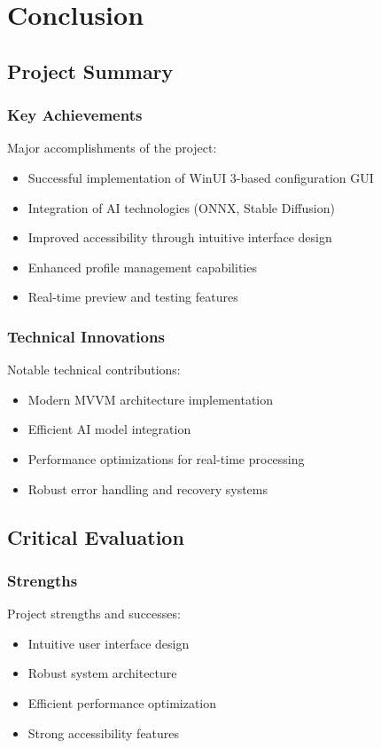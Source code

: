 \chapter{Conclusion}

\section{Project Summary}
\subsection{Key Achievements}
Major accomplishments of the project:
\begin{itemize}
    \item Successful implementation of WinUI 3-based configuration GUI
    \item Integration of AI technologies (ONNX, Stable Diffusion)
    \item Improved accessibility through intuitive interface design
    \item Enhanced profile management capabilities
    \item Real-time preview and testing features
\end{itemize}

\subsection{Technical Innovations}
Notable technical contributions:
\begin{itemize}
    \item Modern MVVM architecture implementation
    \item Efficient AI model integration
    \item Performance optimizations for real-time processing
    \item Robust error handling and recovery systems
\end{itemize}

\section{Critical Evaluation}
\subsection{Strengths}
Project strengths and successes:
\begin{itemize}
    \item Intuitive user interface design
    \item Robust system architecture
    \item Efficient performance optimization
    \item Strong accessibility features
\end{itemize}

